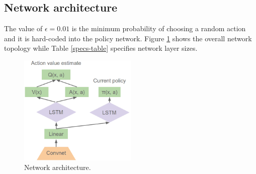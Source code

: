 \documentclass{article}
\begin{document}
\subsection{Network architecture}
The value of 
$\epsilon=0.01$ is the minimum probability of choosing a random action and it 
is hard-coded into the policy network. Figure \ref{netarch} shows the overall 
network topology while Table \ref{specs-table} specifies network layer sizes.
\newpage
\begin{figure}[ht]
\centering
\includegraphics[width=0.5\textwidth]{retrace_algorithm_2}
  \caption{Network architecture.}
  \label{netarch}
\end{figure}
\end{document}
